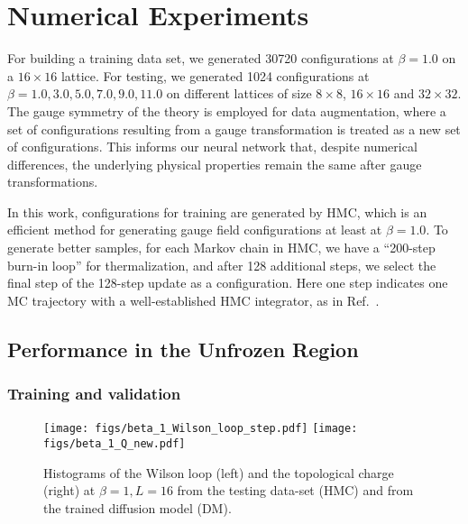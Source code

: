 \documentclass[a4paper,11pt]{article}
\begin{document}
\section{Numerical Experiments}
\label{sec:numerical_experiments}

For building a training data set, we generated 30720 configurations at $\beta = 1.0$ on a $16\times 16$ lattice. For testing, we generated 1024 configurations at $\beta = 1.0, 3.0, 5.0, 7.0, 9.0, 11.0$ on different lattices of size $8\times 8$, $16\times 16$ and $32\times 32$. The gauge symmetry of the theory is employed for data augmentation, where a set of configurations resulting from a gauge transformation is treated as a new set of configurations. This informs our neural network that, despite numerical differences, the underlying physical properties remain the same after gauge transformations. 

In this work, configurations for training are generated by HMC, which is an efficient method for generating gauge field configurations at least at $\beta = 1.0$. To generate better samples, for each Markov chain in HMC, we have a “200-step burn-in loop” for thermalization, and after 128 additional steps, we select the final step of the 128-step update as a configuration. Here one step indicates one MC trajectory with a well-established HMC integrator, as in Ref.~\cite{Wang:2023exq}. 

\subsection{Performance in the Unfrozen Region}

\subsubsection{Training and validation}

\begin{figure}[hbtp!]
\begin{center}
    \texttt{[image: figs/beta\_1\_Wilson\_loop\_step.pdf]}
    \texttt{[image: figs/beta\_1\_Q\_new.pdf]}
\end{center}
\caption{Histograms of the Wilson loop (left)  and the topological charge (right) at $\beta = 1, L=16$ from the testing data-set (HMC) and from the trained diffusion model (DM).}
    \label{fig:beta1_L16}
\end{figure}
\end{document}
